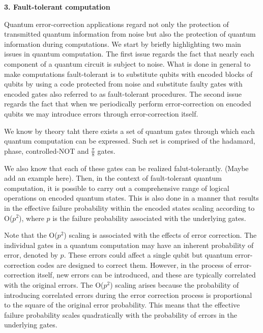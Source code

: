 \documentclass[12pt]{report}
\begin{document}
 
	\begin{minipage}{1 \textwidth}
		
		\textbf{3. Fault-tolerant computation}\newline 
		
		Quantum error-correction applications regard not only the protection of transmitted quantum information from noise but also the protection of quantum information during computations. 
		We start by briefly highlighting two main issues in quantum computation. The first issue regards the fact that nearly each component of a quantum circuit is subject to noise. 
		What is done in general to make computations fault-tolerant is to substitute qubits with encoded blocks of qubits by using a code protected from noise and substitute faulty gates with encoded gates also referred to as fault-tolerant procedures. 
		The second issue regards the fact that when we periodically perform error-correction on encoded qubits we may introduce errors through error-correction itself. \newline
		
		We know by theory taht there exists a set of quantum gates through which each quantum computation can be expressed. Such set is comprised of the hadamard, phase, controlled-NOT and $\frac{\pi}{8}$ gates. 
		
		
		We also know that each of these gates can be realized falut-tolerantly. (Maybe add an example here). Then, in the context of fault-tolerant quantum computation, it is possible to carry out a comprehensive range of logical operations on encoded quantum states. This is also done in a manner that results in the effective failure probability within the encoded states scaling according to O($p^2$), where $p$ is the failure probability associated with the underlying gates. \newline
		
		Note that the O($p^2$) scaling is associated with the effects of error correction. 
		The individual gates in a quantum computation may have an inherent probability of error, denoted by $p$. These errors could affect a single qubit but quantum error-correction codes are designed to correct them. However, in the process of error-correction itself, new errors can be introduced, and these are typically correlated with the original errors. The O($p^2$) scaling arises because the probability of introducing correlated errors during the error correction process is proportional to the square of the original error probability. This means that the effective failure probability scales quadratically with the probability of errors in the underlying gates. \newline
		

\end{minipage}
\end{document}
